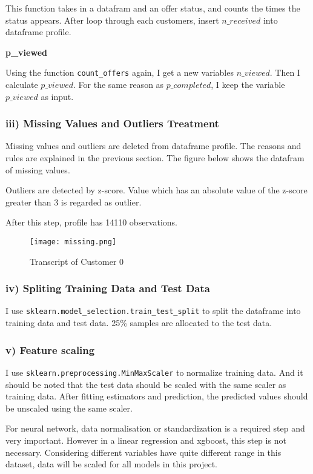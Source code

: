 \documentclass[a4paper,12pt]{article}
\begin{document}
This function takes in a datafram and an offer status, and counts the times the status appears. After loop through each 
customers, insert $n\_received$ into dataframe profile.

\textbf{p\_viewed}

Using the function \texttt{count\_offers} again, I get a new variables $n\_viewed$. Then I calculate $p\_viewed$. For the same 
reason as $p\_completed$, I keep the variable $p\_viewed$ as input.

\subsubsection*{iii) Missing Values and Outliers Treatment}

Missing values and outliers are deleted from dataframe profile. The reasons and rules are explained in the previous section. The 
figure below shows the datafram of missing values.

Outliers are detected by z-score. Value which has an absolute value of the z-score greater than 3 is regarded as outlier.

After this step, profile has 14110 observations.

\begin{figure}[H]
    \centering
    \texttt{[image: missing.png]} 
    \caption{Transcript of Customer 0}
\end{figure}

\subsubsection*{iv) Spliting Training Data and Test Data}

I use \texttt{sklearn.model\_selection.train\_test\_split} to split the dataframe into training data and test data. 25\% samples 
are allocated to the test data.

\subsubsection*{v) Feature scaling}

I use \texttt{sklearn.preprocessing.MinMaxScaler} to normalize training data. And it should be noted that the test data should 
be scaled with the same scaler as training data. After fitting estimators and prediction, the predicted values should be 
unscaled using the same scaler. 

For neural network, data normalisation or standardization is a required step and very important. However in a linear regression 
and xgboost, this step is not necessary. Considering different variables have quite different range in this dataset, data will 
be scaled for all models in this project.
\end{document}

